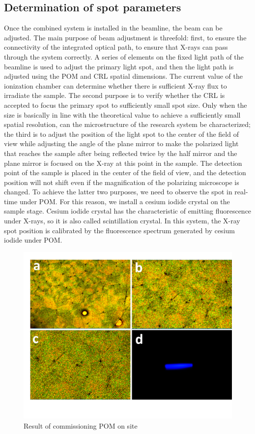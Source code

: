 \documentclass{Head}
\begin{document}
\subsection{Determination of spot parameters}
Once the combined system is installed in the beamline, the beam can be adjusted.
The main purpose of beam adjustment is threefold: first, to ensure the connectivity of the integrated optical path, to ensure that X-rays can pass through the system correctly.
A series of elements on the fixed light path of the beamline is used to adjust the primary light spot, and then the light path is adjusted using the POM and CRL spatial dimensions.
The current value of the ionization chamber can determine whether there is sufficient X-ray flux to irradiate the sample.
The second purpose is to verify whether the CRL is accepted to focus the primary spot to  sufficiently small spot size.
Only when the size is basically in line with the theoretical value to achieve a sufficiently small spatial resolution, can the microstructure of the research system be characterized; the third is to adjust the position of the light spot to the center of the field of view while adjusting the angle of the plane mirror to make the polarized light that reaches the sample after being reflected twice by the half mirror and the plane mirror is focused on the X-ray at this point in the sample.
The detection point of the sample is placed in the center of the field of view, and the detection position will not shift even if the magnification of the polarizing microscope is changed.
To achieve the latter two purposes, we need to observe the spot in real-time under POM.
For this reason, we install a cesium iodide crystal on the sample stage. Cesium iodide crystal has the characteristic of emitting fluorescence under X-rays, so it is also called scintillation crystal. In this system, the X-ray spot position is calibrated by the fluorescence spectrum generated by cesium iodide under POM.
\begin{figure}
    \centering
    \includegraphics[scale=0.5]{Figures/Fig5CommissionPOMOnSite.png}
    \caption{Result of commissioning POM on site}
    \label{pictures}
\end{figure}
\end{document}
